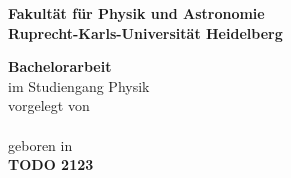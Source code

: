 \begin{titlepage}

\begin{center}
\vspace*{2cm}
\huge{\bf{Fakultät für Physik und Astronomie}} \\
\vspace*{0.2cm}
\LARGE{\bf{Ruprecht-Karls-Universität Heidelberg}}
\end{center}
\vspace*{10cm}
\large
\begin{center}
{\bf{Bachelorarbeit}} \\
\vspace*{0.2cm}
im Studiengang Physik\\
\vspace*{0.2cm}
vorgelegt von\\
\vspace*{0.2cm}
\textbf{\thesisAuthor}\\
\vspace*{0.2cm}
geboren in \thesisAuthorBornIn\\
\vspace*{1cm}
\textbf{TODO 2123}
\end{center}

\end{titlepage}

